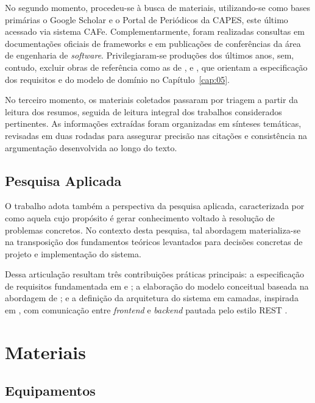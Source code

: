 No segundo momento, procedeu-se à busca de materiais, utilizando-se como bases primárias o Google Scholar e o Portal de Periódicos da CAPES, este último acessado via sistema CAFe. Complementarmente, foram realizadas consultas em documentações oficiais de frameworks e em publicações de conferências da área de engenharia de \textit{software}. Privilegiaram-se produções dos últimos anos, sem, contudo, excluir obras de referência como as de \cite{Sommerville2011}, \cite{pressman2016} e \cite{Larman2007}, que orientam a especificação dos requisitos e do modelo de domínio no Capítulo~\ref{cap:05}.

No terceiro momento, os materiais coletados passaram por triagem a partir da leitura dos resumos, seguida de leitura integral dos trabalhos considerados pertinentes. As informações extraídas foram organizadas em sínteses temáticas, revisadas em duas rodadas para assegurar precisão nas citações e consistência na argumentação desenvolvida ao longo do texto.

\subsection{Pesquisa Aplicada}

O trabalho adota também a perspectiva da pesquisa aplicada, caracterizada por \cite{gerhardt2009} como aquela cujo propósito é gerar conhecimento voltado à resolução de problemas concretos. No contexto desta pesquisa, tal abordagem materializa-se na transposição dos fundamentos teóricos levantados para decisões concretas de projeto e implementação do sistema.

Dessa articulação resultam três contribuições práticas principais: a especificação de requisitos fundamentada em \cite{Sommerville2011} e \cite{pressman2016}; a elaboração do modelo conceitual baseada na abordagem de \cite{Larman2007}; e a definição da arquitetura do sistema em camadas, inspirada em \cite{Fowler2002}, com comunicação entre \textit{frontend} e \textit{backend} pautada pelo estilo REST \cite{Fielding2000}.

\section{Materiais}
\label{sec:materiais}

\subsection{Equipamentos}

